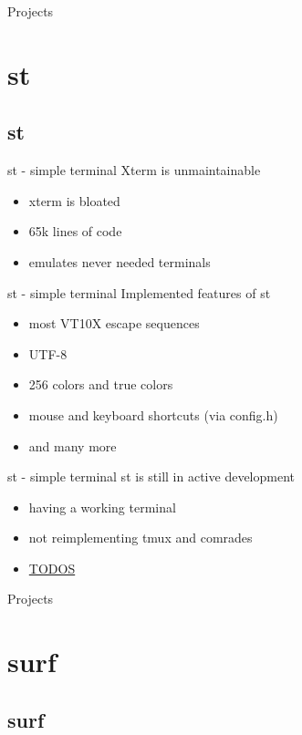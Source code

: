 \documentclass[10pt,graphics,aspectratio=169,table]{beamer}
\begin{document}
\begin{frame}{Projects}
    \section*{st}
    \subsection{st}
\end{frame}

\begin{frame}{st - simple terminal}
Xterm is unmaintainable
\begin{itemize}
    \item xterm is bloated
    \item 65k lines of code
    \item emulates never needed terminals 
\end{itemize}
\end{frame}

\begin{frame}{st - simple terminal}
Implemented features of st
\begin{itemize}
    \item most VT10X escape sequences
    \item UTF-8
    \item 256 colors and true colors
    \item mouse and keyboard shortcuts (via config.h)
    \item and many more
\end{itemize}
\end{frame}

\begin{frame}{st - simple terminal}
st is still in active development
\begin{itemize}
    \item having a working terminal
    \item not reimplementing tmux and comrades
    \item \href{https://git.suckless.org/st/file/TODO.html}{TODOS}
\end{itemize}
\end{frame}

\begin{frame}{Projects}
\section*{surf}
\subsection{surf}
\end{frame}
\end{document}
